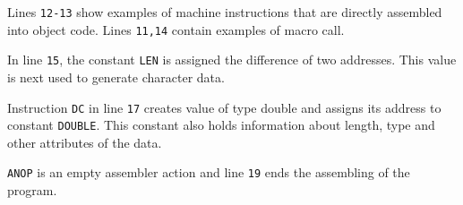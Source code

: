 Lines \verb|12-13| show examples of machine instructions that are directly assembled into object code. Lines \verb|11,14| contain examples of macro call.

In line \verb|15|, the constant \verb|LEN| is assigned the difference of two addresses. This value is next used to generate character data.

Instruction \verb|DC| in line \verb|17| creates value of type double and assigns its address to constant \verb|DOUBLE|. This constant also holds information about length, type and other attributes of the data.  

\verb|ANOP| is an empty assembler action and line \verb|19| ends the assembling of the program. 